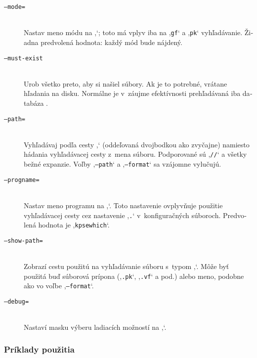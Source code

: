 \documentclass[\classoptions,slovak,english,czech]{\classname}
\newcommand{\singleuv}[1]{,#1`}
\begin{document}
\begin{otherlanguage}{slovak}
\begin{description}
\item[\texttt{--mode=}]\mbox{}\\
  Nastav meno módu na \singleuv{\texttt{}}; toto má vplyv iba na
  \singleuv{\texttt{gf}} a \singleuv{\texttt{pk}} vyhľadávanie. Žiadna predvolená hodnota:
  každý mód bude nájdený.
\item[\texttt{--must-exist}]\mbox{}\\
  Urob všetko preto, aby si našiel súbory. Ak je to potrebné,
vrátane hľadania na disku. Normálne je v~záujme efektívnosti
  prehľadávaná iba databáza .
\item[\texttt{--path=}]\mbox{}\\
  Vyhľadávaj podľa cesty \singleuv{\texttt{}} (oddeľovaná dvojbodkou
  ako zvyčajne) namiesto hádania vyhľadávacej cesty z~mena súboru.
  Podporované sú \singleuv{\texttt{//}} a všetky bežné expanzie. Voľby \singleuv{\texttt{--path}}
  a \singleuv{\texttt{--format}} sa vzájomne vylučujú.
\item[\texttt{--progname=}]\mbox{}\\
  Nastav meno programu na \singleuv{\texttt{}}. Toto nastavenie ovplyvňuje
  použitie vyhľadávacej cesty cez nastavenie \singleuv{\texttt{.}}
  v~konfiguračných súboroch. Predvolená hodnota je \singleuv{\texttt{kpsewhich}}.
\item[\texttt{--show-path=}]\mbox{}\\
  Zobrazí cestu použitú na vyhľadávanie súboru s~typom
\singleuv{\texttt{}}.
  Môže byť použitá buď súborová prípona (\singleuv{\texttt{.pk}}, \singleuv{\texttt{.vf}} a pod.)
  alebo meno, podobne ako vo voľbe \singleuv{\texttt{--format}}.
\item[\texttt{--debug=}]\mbox{}\\
  Nastaví masku výberu ladiacích možností na \singleuv{\texttt{}}.
\end{description}

\subsubsection{Príklady použitia}
\label{sec:examplesofuse}


\end{otherlanguage}
\end{document}
